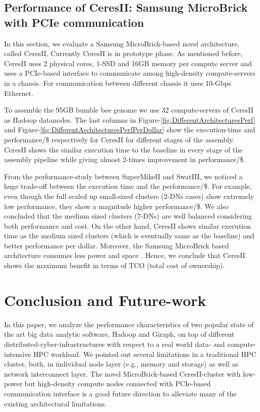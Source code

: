 \documentclass[conference]{IEEEtran}
\begin{document}
\subsection {Performance of CeresII: Samsung MicroBrick with PCIe communication} \label{CeresII:Scaledout-in-a-boxAndSSD}
In this section, we evaluate a Samsung MicroBrick-based novel architecture, called CeresII. Currently CeresII is in prototype phase. As mentioned before, CeresII uses 2 physical cores, 1-SSD and 16GB memory per compute server and uses a PCIe-based interface to communicate among high-density compute-servers in a chassis. For communication between different chassis it uses 10-Gbps Ethernet.

To assemble the 95GB bumble bee genome we use 32 compute-servers of CeresII as Hadoop datanodes. The last columns in Figure-\ref{fig:DifferentArchitecturesPerf} and Figure-\ref{fig:DifferentArchitecturesPerfPerDollar} show the execution-time and performance/\$ respectively for CeresII for different stages of the assembly. CeresII shows the similar execution time to the baseline in every stage of the assembly pipeline while giving almost 2-times improvement in performance/\$.

From the performance-study between SuperMikeII and SwatIII, we noticed a huge trade-off between the execution time and the performance/\$. For example, even though the full scaled up small-sized clusters (2-DNs cases) show extremely low performance, they show a magnitude higher performance/\$. We also concluded that the medium sized clusters (7-DNs) are well balanced considering both performance and cost. On the other hand, CeresII shows similar execution time as the medium sized clusters (which is eventually same as the baseline) and better performance per dollar. Moreover, the Samsung MicroBrick based architecture consumes less power and space \cite{Cluster:ceres1}. Hence, we conclude that CeresII shows the maximum benefit in terms of TCO (total cost of ownership).

\section {Conclusion and Future-work} \label{conclusion}
In this paper, we analyze the performance characteristics of two popular state of the art big data analytic software, Hadoop and Giraph, on top of different distributed-cyber-infrastructures with respect to a real world data- and compute-intensive HPC workload. We pointed out several limitations in a traditional HPC cluster, both, in individual node layer (e.g., memory and storage) as well as network interconnect layer. The novel MicroBrick-based CeresII-cluster with low-power but high-density compute nodes connected with PCIe-based communication interface is a good future direction to alleviate many of the existing architectural limitations.
\end{document}
